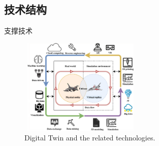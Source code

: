\subsection{技术结构}
\begin{frame}{支撑技术}
\begin{figure}[h!]
\vspace*{-0.15in}
\centering
     \includegraphics[height=1.8in, width=2.3in, viewport=0 0 1416 1171,clip]{Figures/Digital-Twin_related-technologies.png}
\caption{\tiny \textrm{Digital Twin and the related technologies.}}%
\label{Fig:Digital-Twin_related-technologies}
\end{figure} 
\vspace*{-0.15in}
  \begin{columns}
\fontsize{8.2pt}{6.2pt}
\fontsize{8.2pt}{6.2pt}
 \end{columns}
\end{frame}


